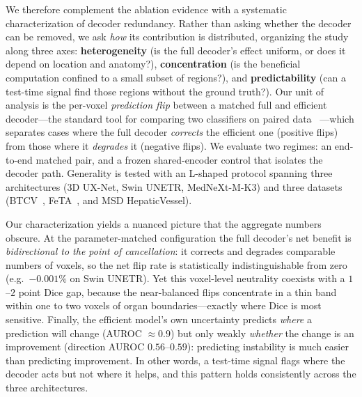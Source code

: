 We therefore complement the ablation evidence with a systematic characterization of
decoder redundancy. Rather than asking whether the decoder can be removed, we ask
\emph{how} its contribution is distributed, organizing the study along three axes:
\textbf{heterogeneity} (is the full decoder's effect uniform, or does it depend on
location and anatomy?), \textbf{concentration} (is the beneficial computation confined to
a small subset of regions?), and \textbf{predictability} (can a test-time signal find
those regions without the ground truth?). Our unit of analysis is the per-voxel
\emph{prediction flip} between a matched full and efficient decoder---the standard tool
for comparing two classifiers on paired data~\cite{yan2021pct,cormier2016churn,mcnemar1947}
---which separates cases where the full decoder \emph{corrects} the efficient one
(positive flips) from those where it \emph{degrades} it (negative flips). We evaluate two
regimes: an end-to-end matched pair, and a frozen shared-encoder control that isolates the
decoder path. Generality is tested with an L-shaped protocol spanning three architectures
(3D UX-Net, Swin UNETR, MedNeXt-M-K3) and three datasets
(BTCV~\cite{antonelli2022msd}, FeTA~\cite{payette2021feta}, and MSD HepaticVessel).

Our characterization yields a nuanced picture that the aggregate numbers obscure. At the
parameter-matched configuration the full decoder's net benefit is
\emph{bidirectional to the point of cancellation}: it corrects and degrades comparable
numbers of voxels, so the net flip rate is statistically indistinguishable from zero
(e.g.\ $-0.001\%$ on Swin UNETR). Yet this voxel-level neutrality coexists with a
$1$--$2$ point Dice gap, because the near-balanced flips concentrate in a thin band within
one to two voxels of organ boundaries---exactly where Dice is most sensitive. Finally,
the efficient model's own uncertainty predicts \emph{where} a prediction will change
(AUROC $\approx\!0.9$) but only weakly \emph{whether} the change is an improvement
(direction AUROC $0.56$--$0.59$): predicting instability is much easier than predicting
improvement. In other words, a test-time signal flags where the decoder acts but not
where it helps, and this pattern holds consistently across the three architectures.

